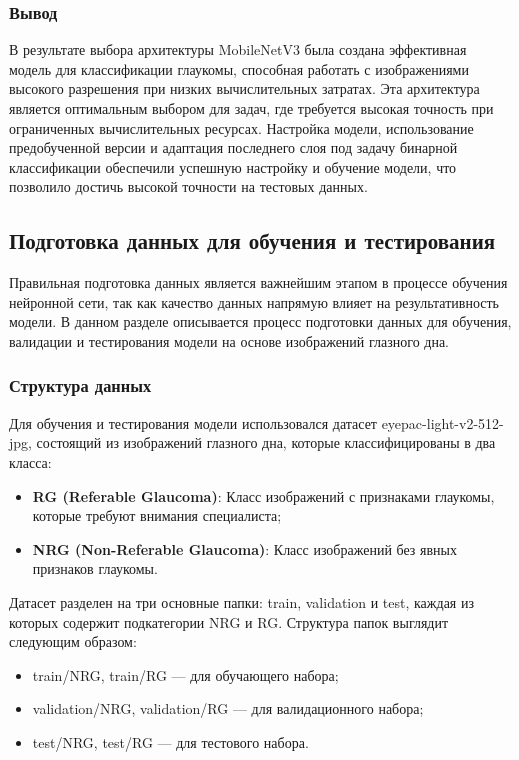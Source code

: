 {    \subsubsection*{Вывод}

    В результате выбора архитектуры MobileNetV3 была создана эффективная модель для классификации глаукомы, способная работать с изображениями высокого разрешения при низких вычислительных затратах. Эта архитектура является оптимальным выбором для задач, где требуется высокая точность при ограниченных вычислительных ресурсах. Настройка модели, использование предобученной версии и адаптация последнего слоя под задачу бинарной классификации обеспечили успешную настройку и обучение модели, что позволило достичь высокой точности на тестовых данных.

\vspace{13pt}
    \subsection{Подготовка данных для обучения и тестирования}

    Правильная подготовка данных является важнейшим этапом в процессе обучения нейронной сети, так как качество данных напрямую влияет на результативность модели. В данном разделе описывается процесс подготовки данных для обучения, валидации и тестирования модели на основе изображений глазного дна.

    \subsubsection*{Структура данных}

    Для обучения и тестирования модели использовался датасет eyepac-light-v2-512-jpg, состоящий из изображений глазного дна, которые классифицированы в два класса:
    \begin{itemize}
        \item \textbf{RG (Referable Glaucoma)}: Класс изображений с признаками глаукомы, которые требуют внимания специалиста;
        \item \textbf{NRG (Non-Referable Glaucoma)}: Класс изображений без явных признаков глаукомы.
    \end{itemize}

    Датасет разделен на три основные папки: train, validation и test, каждая из которых содержит подкатегории NRG и RG. Структура папок выглядит следующим образом:
    \begin{itemize}
        \item train/NRG, train/RG — для обучающего набора;
        \item validation/NRG, validation/RG — для валидационного набора;
        \item test/NRG, test/RG — для тестового набора.
    \end{itemize}

}
